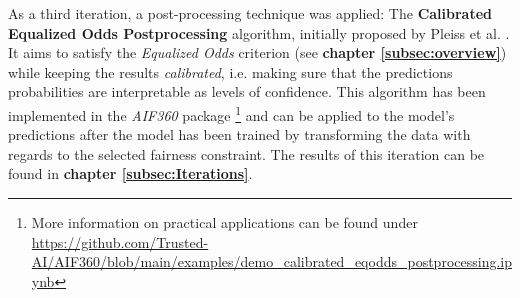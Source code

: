 As a third iteration, a post-processing technique was applied: The \textbf{Calibrated Equalized Odds Postprocessing} algorithm, initially proposed by Pleiss et al. \parencite{Pleiss2017}. It aims to satisfy the \textit{Equalized Odds} criterion (see \textbf{chapter \ref{subsec:overview}}) while keeping the results \textit{calibrated}, i.e. making sure that the predictions probabilities are interpretable as levels of confidence.
This algorithm has been implemented in the \textit{AIF360} package \footnote{More information on practical applications can be found under \url{https://github.com/Trusted-AI/AIF360/blob/main/examples/demo_calibrated_eqodds_postprocessing.ipynb}} and can be applied to the model's predictions after the model has been trained by transforming the data with regards to the selected fairness constraint. The results of this iteration can be found in \textbf{chapter \ref{subsec:Iterations}}. 


